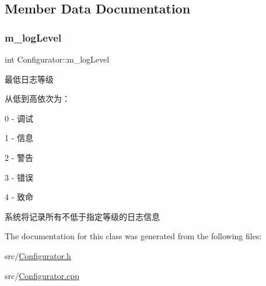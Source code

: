 \subsection{Member Data Documentation}
\mbox{\label{class_configurator_a48b66a5bd8038dd8a186c295111ed7ce}} 
\subsubsection{\texorpdfstring{m\+\_\+log\+Level}{m\_logLevel}}
{\footnotesize\ttfamily int Configurator\+::m\+\_\+log\+Level}



最低日志等级 

从低到高依次为：
\begin{DoxyItemize}
\item 0 -\/ 调试
\item 1 -\/ 信息
\item 2 -\/ 警告
\item 3 -\/ 错误
\item 4 -\/ 致命
\end{DoxyItemize}系统将记录所有不低于指定等级的日志信息 

The documentation for this class was generated from the following files\+:\begin{DoxyCompactItemize}
\item 
src/\hyperlink{_configurator_8h}{Configurator.\+h}\item 
src/\hyperlink{_configurator_8cpp}{Configurator.\+cpp}\end{DoxyCompactItemize}

